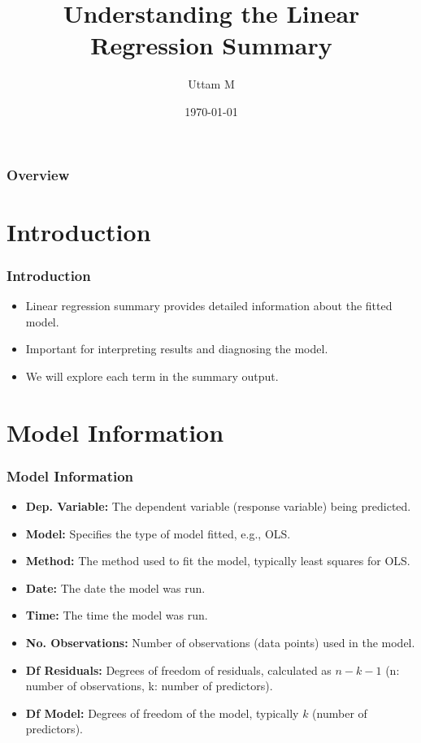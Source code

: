 \documentclass{beamer}
\title{Understanding the Linear Regression Summary}
\author{Uttam M}
\date{\today}
\begin{document}
\frame{\titlepage}

\begin{frame}
    \frametitle{Overview}
    \tableofcontents
\end{frame}

\section{Introduction}
\begin{frame}
    \frametitle{Introduction}
    \begin{itemize}
        \item Linear regression summary provides detailed information about the fitted model.
        \item Important for interpreting results and diagnosing the model.
        \item We will explore each term in the summary output.
    \end{itemize}
\end{frame}

\section{Model Information}
\begin{frame}
    \frametitle{Model Information}
    \begin{itemize}
        \item \textbf{Dep. Variable:} The dependent variable (response variable) being predicted.
        \item \textbf{Model:} Specifies the type of model fitted, e.g., OLS.
        \item \textbf{Method:} The method used to fit the model, typically least squares for OLS.
        \item \textbf{Date:} The date the model was run.
        \item \textbf{Time:} The time the model was run.
        \item \textbf{No. Observations:} Number of observations (data points) used in the model.
        \item \textbf{Df Residuals:} Degrees of freedom of residuals, calculated as \( n - k - 1 \) (n: number of observations, k: number of predictors).
        \item \textbf{Df Model:} Degrees of freedom of the model, typically \( k \) (number of predictors).
    \end{itemize}
\end{frame}
\end{document}
